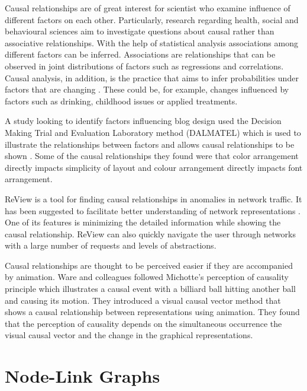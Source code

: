 \documentclass{l4proj}
\begin{document}
Causal relationships are of great interest for scientist who examine influence of different factors on each other. Particularly, research regarding health, social and behavioural sciences aim to investigate questions about causal rather than associative relationships. With the help of statistical analysis associations among different factors can be inferred. Associations are relationships that can be observed in joint distributions of factors such as regressions and correlations. Causal analysis, in addition, is the practice that aims to infer probabilities under factors that are changing \cite{pearl2010introduction}. These could be, for example, changes influenced by factors such as drinking, childhood issues or applied treatments. 

A study looking to identify factors influencing blog design used the Decision Making Trial and Evaluation Laboratory method (DALMATEL) which is used to illustrate the relationships between factors and allows causal relationships to be shown \cite{hsu2012evaluation}. Some of the causal relationships they found were that color arrangement directly impacts simplicity of layout and colour arrangement directly impacts font arrangement. 

ReView is a tool for finding causal relationships in anomalies in network traffic. It has been suggested to facilitate better understanding of network representations \cite{Zhang:2015:VTC:2713579.2713583}. One of its features is minimizing the detailed information while showing the causal relationship. ReView can also quickly navigate the user through networks with a large number of requests and levels of abstractions.

Causal relationships are thought to be perceived easier if they are accompanied by animation. Ware and colleagues \cite{ware1999visualizing} followed Michotte's perception of causality principle which illustrates a causal event with a billiard ball hitting another ball and causing its motion. They introduced a visual causal vector method that shows a causal relationship between representations using animation. They found that the perception of causality depends on the simultaneous occurrence the visual causal vector and the change in the graphical representations. 

\section{Node-Link Graphs}
\end{document}
